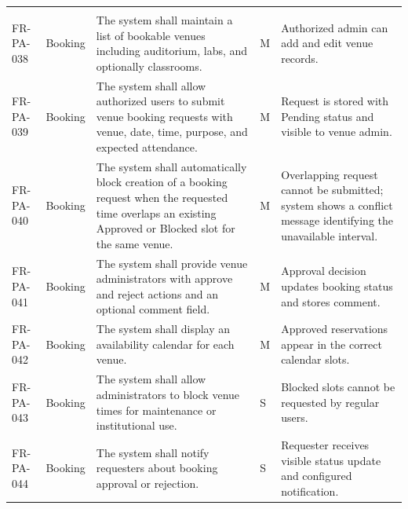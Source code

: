 \documentclass[12pt,a4paper]{article}
\begin{document}
\begin{longtable}{@{}L{2cm}L{2.4cm}L{6cm}C{0.9cm}L{3.4cm}@{}}
\\
FR-PA-038 & Booking & The system shall maintain a list of bookable venues including auditorium, labs, and optionally classrooms. & M & Authorized admin can add and edit venue records. \\
FR-PA-039 & Booking & The system shall allow authorized users to submit venue booking requests with venue, date, time, purpose, and expected attendance. & M & Request is stored with Pending status and visible to venue admin. \\
FR-PA-040 & Booking & The system shall automatically block creation of a booking request when the requested time overlaps an existing Approved or Blocked slot for the same venue. & M & Overlapping request cannot be submitted; system shows a conflict message identifying the unavailable interval. \\
FR-PA-041 & Booking & The system shall provide venue administrators with approve and reject actions and an optional comment field. & M & Approval decision updates booking status and stores comment. \\
FR-PA-042 & Booking & The system shall display an availability calendar for each venue. & M & Approved reservations appear in the correct calendar slots. \\
FR-PA-043 & Booking & The system shall allow administrators to block venue times for maintenance or institutional use. & S & Blocked slots cannot be requested by regular users. \\
FR-PA-044 & Booking & The system shall notify requesters about booking approval or rejection. & S & Requester receives visible status update and configured notification. \\


\end{longtable}
\end{document}
